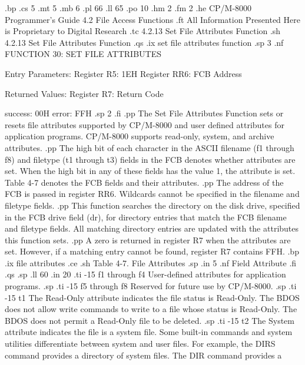 .bp
.cs 5
.mt 5
.mb 6
.pl 66
.ll 65
.po 10
.hm 2
.fm 2
.he CP/M-8000 Programmer's Guide            4.2  File Access Functions
.ft All Information Presented Here is Proprietary to Digital Research
.tc         4.2.13  Set File Attributes Function
.sh
4.2.13  Set File Attributes Function
.qs
.ix set file attributes function
.sp 3
.nf
                FUNCTION 30:  SET FILE ATTRIBUTES

                Entry Parameters:
                   Register   R5:  1EH
                   Register  RR6:  FCB Address

                Returned  Values:
                   Register   R7:  Return Code

                                   success:  00H
                                     error:  FFH
.sp 2
.fi
.pp
The Set File Attributes Function sets or resets file attributes
supported by CP/M-8000 and user defined attributes for application 
programs. CP/M-8000 supports read-only, system, and archive 
attributes. 
.pp
The high bit of each character in the ASCII filename (f1 through
f8) and filetype (t1 through t3) fields in the FCB denotes
whether attributes are set. When the high bit in any of these
fields has the value 1, the attribute is set. Table 4-7 denotes
the FCB fields and their attributes. 
.pp
The address of the
FCB is passed in register  RR6.  Wildcards cannot be specified in
the filename and filetype fields. 
.pp
This function searches the directory on the disk drive, specified
in the FCB drive field (dr), for directory entries that match the
FCB filename and filetype fields. All matching directory entries
are updated with the attributes this function sets.
.pp
A zero is returned in register   R7 when the attributes are set. 
However, if a matching entry cannot be found, register   R7 contains 
FFH.  
.bp
.ix file attributes
.ce
.sh
Table 4-7.  File Attributes
.sp 
.in 5
.nf
    Field                       Attribute
.fi
.qs
.sp
.ll 60
.in 20
.ti -15
f1 through f4  User-defined attributes for application 
programs.
.sp
.ti -15
f5 through f8  Reserved for future use by CP/M-8000.
.sp
.ti -15
t1             The Read-Only attribute indicates the file
status is Read-Only.  The BDOS does not allow write commands
to write to a file whose status is Read-Only. The BDOS does not
permit a Read-Only file to be deleted.
.sp
.ti -15
t2             The System attribute indicates the file is a system file. 
Some built-in commands and system utilities differentiate
between system and user files. For example, the DIRS command
provides a directory of system files. The DIR command provides a
